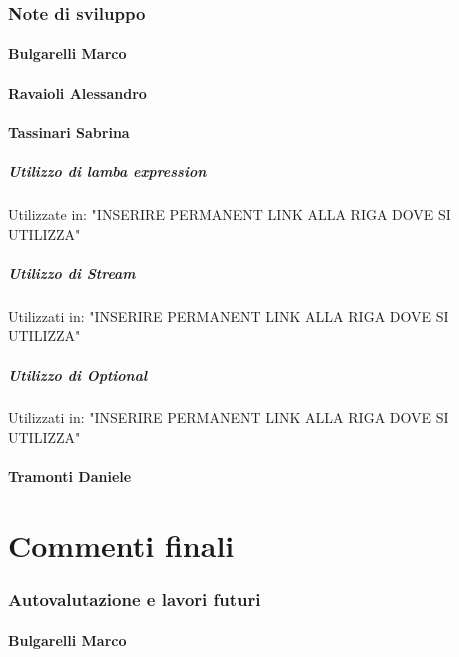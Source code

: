 \documentclass{report}
\begin{document}
\subsection{Note di sviluppo}

\subsubsection{Bulgarelli Marco}

\subsubsection{Ravaioli Alessandro}

\subsubsection{Tassinari Sabrina}
\paragraph{Utilizzo di lamba expression}
Utilizzate in: "INSERIRE PERMANENT LINK ALLA RIGA DOVE SI UTILIZZA"

\paragraph{Utilizzo di Stream}
Utilizzati in: "INSERIRE PERMANENT LINK ALLA RIGA DOVE SI UTILIZZA"

\paragraph{Utilizzo di Optional}
Utilizzati in: "INSERIRE PERMANENT LINK ALLA RIGA DOVE SI UTILIZZA"

\subsubsection{Tramonti Daniele}

\chapter{Commenti finali}

\subsection{Autovalutazione e lavori futuri}

\subsubsection{Bulgarelli Marco}
\end{document}
